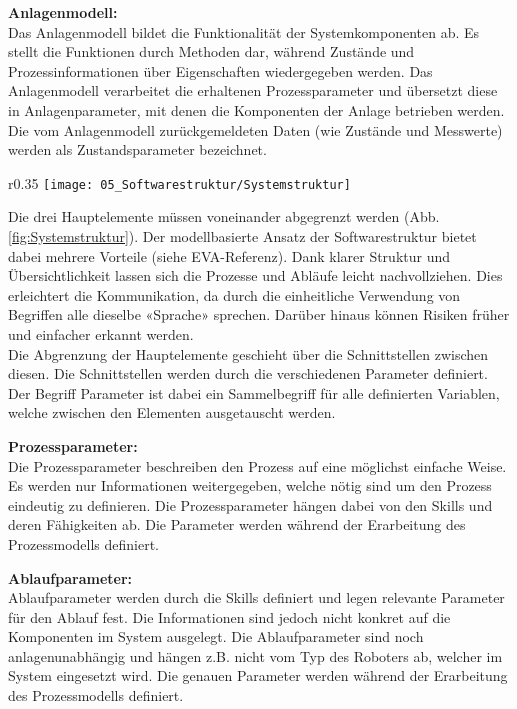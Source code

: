	\textbf{Anlagenmodell:}
	\vspace{2mm} 
	\\
	Das Anlagenmodell bildet die Funktionalität der Systemkomponenten ab. Es stellt die Funktionen durch Methoden dar, während Zustände und Prozessinformationen über Eigenschaften wiedergegeben werden. Das Anlagenmodell verarbeitet die erhaltenen Prozessparameter und übersetzt diese in Anlagenparameter, mit denen die Komponenten der Anlage betrieben werden. Die vom Anlagenmodell zurückgemeldeten Daten (wie Zustände und Messwerte) werden als Zustandsparameter bezeichnet. 
	\\
	\vspace{-13mm}
	\begin{wrapfigure}{r}{0.35\textwidth}
		\centering
		\texttt{[image: 05\_Softwarestruktur/Systemstruktur]}
		\captionsetup{justification=centering}
		\caption{Systemstruktur}
		\label{fig:Systemstruktur}
	\end{wrapfigure} \par
	Die drei Hauptelemente müssen voneinander abgegrenzt werden (Abb. \ref{fig:Systemstruktur}). Der modellbasierte Ansatz der Softwarestruktur bietet dabei mehrere Vorteile (siehe EVA-Referenz). Dank klarer Struktur und Übersichtlichkeit lassen sich die Prozesse und Abläufe leicht nachvollziehen. Dies erleichtert die Kommunikation, da durch die einheitliche Verwendung von Begriffen alle dieselbe «Sprache» sprechen. Darüber hinaus können Risiken früher und einfacher erkannt werden.
	\\
	Die Abgrenzung der Hauptelemente geschieht über die Schnittstellen zwischen diesen. Die Schnittstellen werden durch die verschiedenen Parameter definiert. Der Begriff Parameter ist dabei ein Sammelbegriff für alle definierten Variablen, welche zwischen den Elementen ausgetauscht werden.
	
	\textbf{Prozessparameter:}
	\vspace{2mm} 
	\\
	Die Prozessparameter beschreiben den Prozess auf eine möglichst einfache Weise. Es werden nur Informationen weitergegeben, welche nötig sind um den Prozess eindeutig zu definieren. Die Prozessparameter hängen dabei von den Skills und deren Fähigkeiten ab. Die Parameter werden während der Erarbeitung des Prozessmodells definiert.
	
	\textbf{Ablaufparameter:}
	\vspace{2mm} 
	\\
	Ablaufparameter werden durch die Skills definiert und legen relevante Parameter für den Ablauf fest. Die Informationen sind jedoch nicht konkret auf die Komponenten im System ausgelegt. Die Ablaufparameter sind noch anlagenunabhängig und hängen z.B. nicht vom Typ des Roboters ab, welcher im System eingesetzt wird. Die genauen Parameter werden während der Erarbeitung des Prozessmodells definiert.
	
